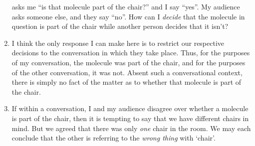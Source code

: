 \documentclass[11pt]{article}
\begin{document}
\begin{spacing}{1.5}
\begin{enumerate}
    asks me ``is that molecule part of the chair?'' and I say
    ``yes''.  My audience asks someone else, and they say ``no''.  How
    can I {\em decide} that the molecule in question is part of the
    chair while another person decides that it isn't?
  \item I think the only response I can make here is to restrict our
    respective decisions to the conversation in which they take
    place.  Thus, for the purposes of my conversation, the molecule
    was part of the chair, and for the purposes of the other
    conversation, it was not.  Absent such a conversational context,
    there is simply no fact of the matter as to whether that molecule
    is part of the chair.
  \item If within a conversation, I and my audience disagree over
    whether a molecule is part of the chair, then it is tempting to
    say that we have different chairs in mind.  But we agreed that
    there was only {\em one} chair in the room.  We may each conclude
    that the other is referring to the {\em wrong thing} with `chair'.

\end{enumerate}

\ifstandalone


\end{spacing}
\fi
\end{document}
